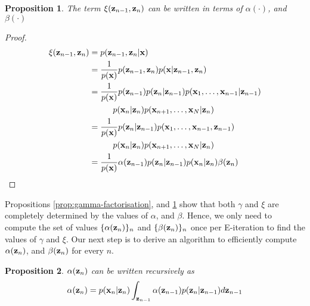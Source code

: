 \documentclass[11pt]{article}
\numberwithin{equation}{section}
\newcommand{\x}{{\bf x}}
\newcommand{\z}{{\bf z}}
\newtheorem{proposition}{Proposition}[section]
\begin{document}
\begin{proposition}\label{prop:xi-factorisation}
	The term $\xi(\z_{n-1}, \z_n)$ can be written in terms of $\alpha({\cdot})$, and $\beta(\cdot)$
\end{proposition}

\begin{proof}
	\begin{align}
		\xi(\z_{n-1}, \z_{n}) &= p(\z_{n-1}, \z_{n} \vert \x)\\
		&= \frac{1}{p(\x)}p(\z_{n-1}, \z_{n}) p(\x \vert \z_{n-1}, \z_{n})\\
		&= \frac{1}{p(\x)} p(\z_{n-1}) p(\z_{n} \vert \z_{n-1}) p(\x_1, \ldots, \x_{n-1}\vert \z_{n-1}) \nonumber \\
			&\hspace{1cm} p(\x_n\vert \z_n) p(\x_{n+1}, \ldots, \x_N \vert \z_n)\\
		&= \frac{1}{p(\x)} p(\z_{n} \vert \z_{n-1}) p(\x_1, \ldots, \x_{n-1}, \z_{n-1}) \nonumber \\
			&\hspace{1cm} p(\x_n\vert \z_n) p(\x_{n+1}, \ldots, \x_N \vert \z_n)\\
		&= \frac{1}{p(\x)} \alpha(\z_{n-1}) p(\z_{n} \vert \z_{n-1}) p(\x_n \vert \z_n) \beta(\z_n)
	\end{align}
\end{proof}


Propositions \ref{prop:gamma-factorisation}, and \ref{prop:xi-factorisation} show that both $\gamma$ and $\xi$ are completely determined by the values of $\alpha$, and $\beta$. Hence, we only need to compute the set of values $\{\alpha(\z_n)\}_n$ and $\{\beta(\z_n)\}_n$ once per E-iteration to find the values of $\gamma$ and $\xi$. Our next step is to derive an algorithm to efficiently compute $\alpha(\z_n)$, and $\beta(\z_n)$ for every $n$.

\begin{proposition} \label{prop:alpha-recursive}
	$\alpha(\z_n)$ can be written recursively as
	\begin{equation}
		\alpha(\z_n) = p(\x_n\vert \z_n) \int_{\z_{n-1}} \alpha(\z_{n-1})p(\z_n\vert\z_{n-1}) d\z_{n-1}
	\end{equation}
\end{proposition}
\end{document}
